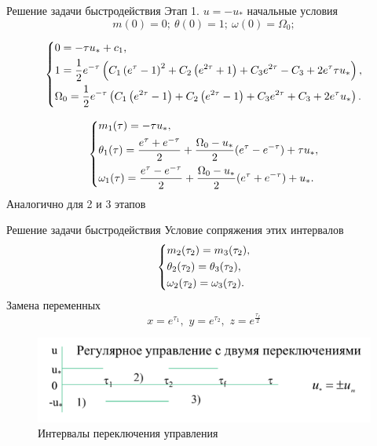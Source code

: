 \documentclass[10pt]{beamer}
\begin{document}
\begin{frame}{Решение задачи быстродействия}
	Этап 1. $u=-u_*$ начальные условия
\[
    m(0)=0;\ \theta(0)=1;\ \omega(0)=\Omega_0;
\]

\[
    \left\{ {\begin{aligned}
                 & 0 = -\tau  u_*+c_1, \hfill                                                            \\
                 & 1 = \frac{1}{2} e^{-\tau } \left(C_1 \left(e^{\tau }-1\right)^2+C_2 \left(e^{2
                \tau }+1\right)+C_3 e^{2 \tau }-C_3+2 e^{\tau } \tau  u_*\right) , \hfill                \\
                 & \Omega_0 = \frac{1}{2} e^{-\tau } \left(C_1 \left(e^{2 \tau }-1\right)+C_2 \left(e^{2
                \tau }-1\right)+C_3 e^{2 \tau }+C_3+2 e^{\tau } u_*\right)  . \hfill                     \\
            \end{aligned}} \right.
\]

\[
    \left\{ {\begin{aligned}
                 & m_1(\tau) = -\tau  u_*, \hfill                                                                         \\
                 & \theta_1(\tau) = \frac{e^\tau+e^{-\tau}}{2}+\frac{\Omega_0-u_*}{2}(e^\tau-e^{-\tau})+\tau u_* , \hfill \\
                 & \omega_1(\tau) =\frac{e^\tau-e^{-\tau}}{2}+\frac{\Omega_0-u_*}{2}(e^\tau+e^{-\tau})+u_*   . \hfill     \\
            \end{aligned}} \right.
\]
Аналогично для 2 и 3 этапов
\end{frame}
\begin{frame}{Решение задачи быстродействия}
	Условие сопряжения этих интервалов
\[
    \left\{ {\begin{aligned}
                 & m_2(\tau_2) = m_3(\tau_2), \hfill            \\
                 & \theta_2(\tau_2) =  \theta_3(\tau_2), \hfill \\
                 & \omega_2(\tau_2) = \omega_3(\tau_2) . \hfill \\
            \end{aligned}} \right.
\]
	Замена переменных
\[
    x=e^{\tau_1} ,\,\,y=e^{\tau_2} ,\,\,z=e^{\frac{\tau_f}{2}}
\]
		\begin{figure}[h!]
			\includegraphics[width=0.8\linewidth]{images/control_intervals.png}
			\caption{Интервалы переключения управления}
		\end{figure}

\end{frame}
	
\end{document}
